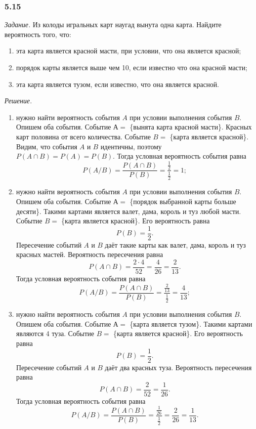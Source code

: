 \subsubsection*{5.15}

\textit{Задание.} Из колоды игральных карт наугад вынута одна карта.
Найдите вероятность того, что:
\begin{enumerate}[label=\alph*)]
\item эта карта является красной масти, при условии, что она является красной;
\item порядок карты является выше чем 10, если известно что она красной масти;
\item эта карта является тузом, если известно, что она является красной.
\end{enumerate}

\textit{Решение.} 
\begin{enumerate}[label=\alph*)]
\item нужно найти вероятность события $A$ при условии выполнения события $B$.
Опишем оба события.
Событие $А =$ \{вынята карта красной масти\}.
Красных карт половина от всего количества.
Событие $B =$ \{карта является красной\}.
Видим, что события $A$ и $B$ идентичны, поэтому $P \left( A \cap B \right) = P \left( A \right) = P \left( B \right)$.
Тогда условная вероятность события равна
$$P \left( A/B \right) =
\frac{P \left( A \cap B \right)}{P \left( B \right) } =
\frac{ \frac{1}{2} }{ \frac{1}{2} } =
1;$$
\item нужно найти вероятность события $A$ при условии выполнения события $B$.
Опишем оба события.
Событие $А =$ \{порядок выбранной карты больше десяти\}.
Такими картами является валет, дама, король и туз любой масти.
Событие $B =$ \{карта является красной\}.
Его вероятность равна
$$P \left( B \right) =
\frac{1}{2}.$$
Пересечение событий $A$ и $B$ даёт такие карты как валет, дама, король и туз красных мастей.
Вероятность пересечения равна
$$P \left( A \cap B \right) =
\frac{2 \cdot 4}{52} =
\frac{4}{26} =
\frac{2}{13}.$$
Тогда условная вероятность события равна
$$P \left( A/B \right) =
\frac{P \left( A \cap B \right)}{P \left( B \right) } =
\frac{ \frac{2}{13} }{ \frac{1}{2} } =
\frac{4}{13};$$
\item нужно найти вероятность события $A$ при условии выполнения события $B$.
Опишем оба события.
Событие $А =$ \{карта является тузом\}.
Такими картами являются 4 туза.
Событие $B =$ \{карта является красной\}.
Его вероятность равна
$$P \left( B \right) =
\frac{1}{2}.$$
Пересечение событий $A$ и $B$ даёт два красных туза.
Вероятность пересечения равна
$$P \left( A \cap B \right) =
\frac{2}{52} =
\frac{1}{26}.$$
Тогда условная вероятность события равна
$$P \left( A/B \right) =
\frac{P \left( A \cap B \right)}{P \left( B \right) } =
\frac{ \frac{1}{26} }{ \frac{1}{2} } =
\frac{2}{26} =
\frac{1}{13}.$$
\end{enumerate}

